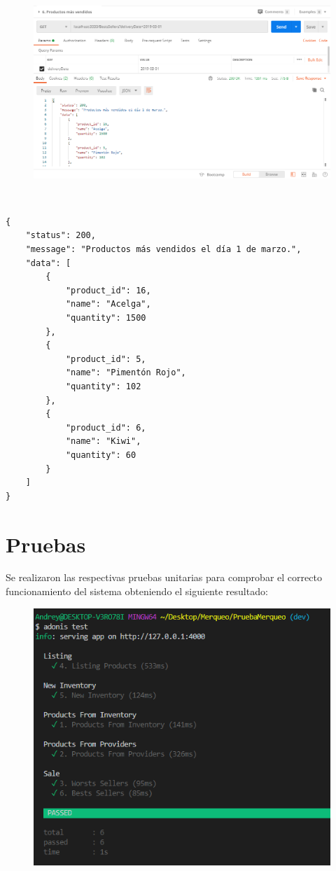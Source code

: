 \documentclass{article}
\begin{document}
\begin{figure}[h!]
\centering
\includegraphics[scale=0.5]{6.png}
\end{figure}

\\
\begin{verbatim}
{
    "status": 200,
    "message": "Productos más vendidos el día 1 de marzo.",
    "data": [
        {
            "product_id": 16,
            "name": "Acelga",
            "quantity": 1500
        },
        {
            "product_id": 5,
            "name": "Pimentón Rojo",
            "quantity": 102
        },
        {
            "product_id": 6,
            "name": "Kiwi",
            "quantity": 60
        }
    ]
}
\end{verbatim}
\clearpage
\section{Pruebas}
Se realizaron las respectivas pruebas unitarias para comprobar el correcto funcionamiento del sistema obteniendo el siguiente resultado:

\begin{figure}[h!]
\centering
\includegraphics[scale=1]{test.png}
\end{figure}
\end{document}
